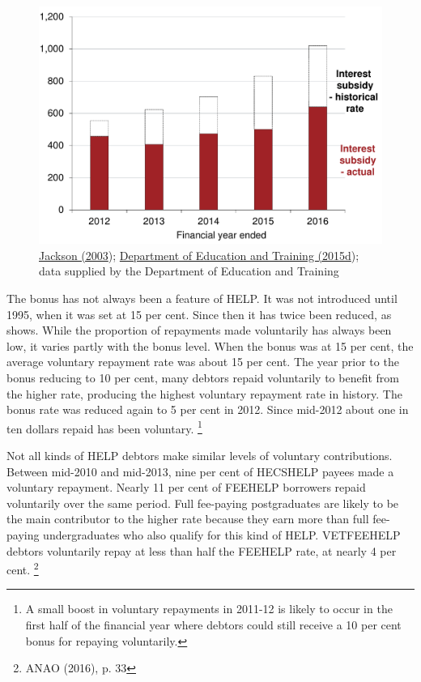 \documentclass[embargoed]{grattan}
\begin{document}
{\begin{figure}
\includegraphics[page=8]{atlas/Chartpack.pdf}
{\protect\hyperlink{_ENREF_50}{Jackson (2003}); \protect\hyperlink{_ENREF_27}{Department of Education and Training (2015d}); data supplied by the Department of Education and Training}
\end{figure}

The bonus has not always been a feature of \gls{HELP}.
It was not introduced until 1995, when it was set at 15 per cent.
Since then it has twice been reduced, as  shows.
While the proportion of repayments made voluntarily has always been low, it varies partly with the bonus level.
When the bonus was at 15 per cent, the average voluntary repayment rate was about 15 per cent.
The year prior to the bonus reducing to 10 per cent, many debtors repaid voluntarily to benefit from the higher rate, producing the highest voluntary repayment rate in history.
The bonus rate was reduced again to 5 per cent in 2012.
Since mid-2012 about one in ten dollars repaid has been voluntary.%
\footnote{A small boost in voluntary repayments in 2011-12 is likely to occur in the first half of the financial year where debtors could still receive a 10 per cent bonus for repaying voluntarily.}

Not all kinds of \gls{HELP} debtors make similar levels of voluntary contributions.
Between mid-2010 and mid-2013, nine per cent of \gls{HECSHELP} payees made a voluntary repayment.
Nearly 11 per cent of \gls{FEEHELP} borrowers repaid voluntarily over the same period.
Full fee-paying postgraduates are likely to be the main contributor to the higher rate because they earn more than full fee-paying undergraduates who also qualify for this kind of \gls{HELP}.
\gls{VETFEEHELP} debtors voluntarily repay at less than half the \gls{FEEHELP} rate, at nearly 4 per cent.%
\footnote{ANAO (2016), p. 33}

}
\end{document}
